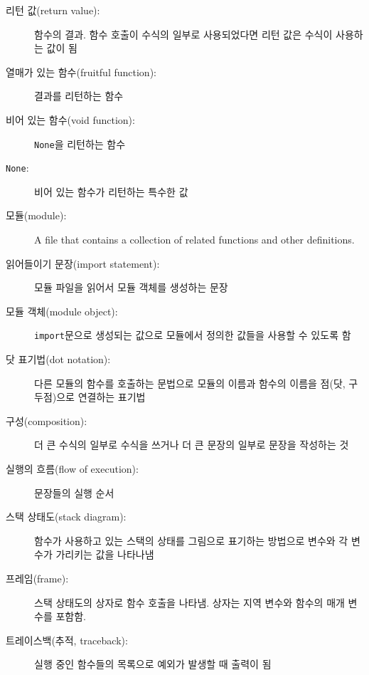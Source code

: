 \documentclass[10pt]{book}
\begin{document}
\begin{description}
\item[리턴 값(return value):] 함수의 결과.  함수 호출이 수식의 일부로
  사용되었다면 리턴 값은 수식이 사용하는 값이 됨

\item[열매가 있는 함수(fruitful function):]  결과를 리턴하는 함수

\item[비어 있는 함수(void function):] {\tt None}을 리턴하는 함수

\item[{\tt None}:]  비어 있는 함수가 리턴하는 특수한 값

\item[모듈(module):] A file that contains a
collection of related functions and other definitions.

\item[읽어들이기 문장(import statement):] 모듈 파일을 읽어서 모듈
  객체를 생성하는 문장

\item[모듈 객체(module object):] {\tt import}문으로 생성되는 값으로
  모듈에서 정의한 값들을 사용할 수 있도록 함

\item[닷 표기법(dot notation):] 다른 모듈의 함수를 호출하는 문법으로
  모듈의 이름과 함수의 이름을 점(닷, 구두점)으로 연결하는 표기법

\item[구성(composition):] 더 큰 수식의 일부로 수식을 쓰거나 더 큰
  문장의 일부로 문장을 작성하는 것

\item[실행의 흐름(flow of execution):]  문장들의 실행 순서

\item[스택 상태도(stack diagram):] 함수가 사용하고 있는 스택의 상태를
  그림으로 표기하는 방법으로 변수와 각 변수가 가리키는 값을 나타나냄

\item[프레임(frame):] 스택 상태도의 상자로 함수 호출을 나타냄.  상자는
  지역 변수와 함수의 매개 변수를 포함함.

\item[트레이스백(추적, traceback):] 실행 중인 함수들의 목록으로 예외가
  발생할 때 출력이 됨


\end{description}
\end{document}
